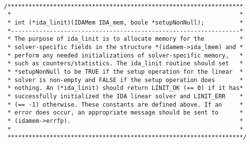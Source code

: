 \small
\begin{verbatim}

/*******************************************************************
 *                                                                 *
 * int (*ida_linit)(IDAMem IDA_mem, boole *setupNonNull);          *
 *-----------------------------------------------------------------*
 * The purpose of ida_linit is to allocate memory for the          *
 * solver-specific fields in the structure *(idamem->ida_lmem) and *
 * perform any needed initializations of solver-specific memory,   *
 * such as counters/statistics. The ida_linit routine should set   *
 * *setupNonNull to be TRUE if the setup operation for the linear  *
 * solver is non-empty and FALSE if the setup operation does       *
 * nothing. An (*ida_linit) should return LINIT_OK (== 0) if it has*
 * successfully initialized the IDA linear solver and LINIT_ERR    *
 * (== -1) otherwise. These constants are defined above. If an     *
 * error does occur, an appropriate message should be sent to      *
 * (idamem->errfp).                                                *
 *                                                                 *
 *******************************************************************/


\end{verbatim}
